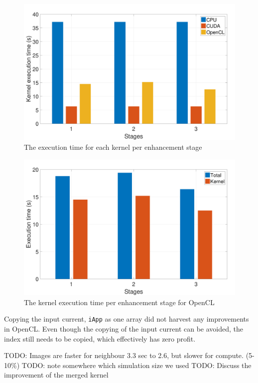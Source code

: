 \documentclass[final]{report}
\begin{document}
\begin{figure}[H]
\centering
    \includegraphics[width=\textwidth]{resources/kernel-time-graph.pdf}
    \caption{The execution time for each kernel per enhancement stage}
    \label{fig:kernel-time-graph}
\end{figure}

\begin{figure}[H]
\centering
    \includegraphics[width=\textwidth]{resources/opencl-per-stage-graph.pdf}
    \caption{The kernel execution time per enhancement stage for OpenCL}
    \label{fig:opencl-per-stage-graph}
\end{figure}

Copying the input current, \texttt{iApp} as one array did not harvest any improvements in OpenCL.
Even though the copying of the input current can be avoided, the index still needs to be copied, which effectively has zero profit.

TODO: Images are faster for neighbour 3.3 sec to 2.6, but slower for compute. (5-10\%)
TODO: note somewhere which simulation size we used
TODO: Discuss the improvement of the merged kernel
\end{document}
